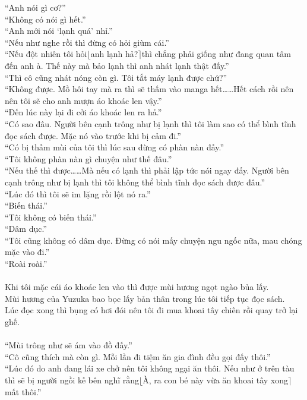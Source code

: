 \documentclass[12pt,a4paper, twosides]{book}
\begin{document}
“Anh nói gì cơ?”\\
“Không có nói gì hết.”\\
“Anh mới nói ‘lạnh quá’ nhỉ.”\\
“Nếu như nghe rồi thì đừng có hỏi giùm cái.”\\
“Nếu đột nhiên tôi hỏi$\lfloor$anh lạnh hả?$\rceil$thì chẳng phải giống như đang quan tâm đến anh à. Thế này mà bảo lạnh thì anh nhát lạnh thật đấy.”\\
“Thì cô cũng nhát nóng còn gì. Tôi tắt máy lạnh được chứ?”\\
“Không được. Mồ hôi tay mà ra thì sẽ thấm vào manga hết……Hết cách rồi nên nên tôi sẽ cho anh mượn áo khoác len vậy.”\\
“Đến lúc này lại đi cởi áo khoác len ra hả.”\\
“Có sao đâu. Người bên cạnh trông như bị lạnh thì tôi làm sao có thể bình tĩnh đọc sách được. Mặc nó vào trước khi bị cảm đi.”\\
“Có bị thấm mùi của tôi thì lúc sau đừng có phàn nàn đấy.”\\
“Tôi không phàn nàn gì chuyện như thế đâu.”\\
“Nếu thế thì được……Mà nếu có lạnh thì phải lập tức nói ngay đấy. Người bên cạnh trông như bị lạnh thì tôi không thể bình tĩnh đọc sách được đâu.”\\
“Lúc đó thì tôi sẽ im lặng rồi lột nó ra.”\\
“Biến thái.”\\
“Tôi không có biến thái.”\\
“Dâm dục.”\\
“Tôi cũng không có dâm dục. Đừng có nói mấy chuyện ngu ngốc nữa, mau chóng mặc vào đi.”\\
“Roài roài.”\\
\\
Khi tôi mặc cái áo khoác len vào thì được mùi hương ngọt ngào bủa lấy.\\
Mùi hương của Yuzuka bao bọc lấy bản thân trong lúc tôi tiếp tục đọc sách.\\
Lúc đọc xong thì bụng có hơi đói nên tôi đi mua khoai tây chiên rồi quay trở lại ghế.\\
\\
“Mùi trông như sẽ ám vào đồ đấy.”\\
“Cô cũng thích mà còn gì. Mỗi lần đi tiệm ăn gia đình đều gọi đấy thôi.”\\
“Lúc đó do anh đang lái xe chở nên tôi không ngại ăn thôi. Nếu như ở trên tàu thì sẽ bị người ngồi kế bên nghĩ rằng$\lfloor$À, ra con bé này vừa ăn khoai tây xong$\rceil$mất thôi.”\\
\end{document}
